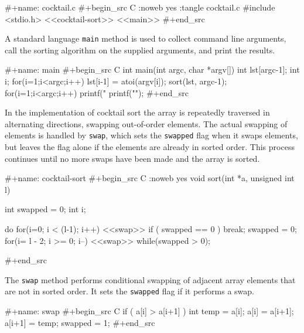 \documentclass[article,shortnames]{jss}
\begin{document}
\begin{Code}
#+name: cocktail.c
#+begin_src C :noweb yes :tangle cocktail.c
  #include <stdio.h>
  <<cocktail-sort>>
  <<main>>
#+end_src
\end{Code}






A standard  language \texttt{main} method is used to collect command line
arguments, call the sorting algorithm on the supplied arguments, and
print the results.


\begin{Code}
#+name: main
#+begin_src C
  int main(int argc, char *argv[]) {
    int lst[argc-1];
    int i;
    for(i=1;i<argc;i++)
      lst[i-1] = atoi(argv[i]);
    sort(lst, argc-1);
    for(i=1;i<argc;i++)
      printf("%
    printf("\n");
  }
#+end_src
\end{Code}






In the implementation of cocktail sort the array is repeatedly
traversed in alternating directions, swapping out-of-order elements.
The actual swapping of elements is handled by \texttt{swap}, which sets the
\texttt{swapped} flag when it swaps elements, but leaves the flag alone if
the elements are already in sorted order.  This process continues
until no more swaps have been made and the array is sorted.


\begin{Code}
#+name: cocktail-sort
#+begin_src C :noweb yes
  void sort(int *a, unsigned int l)
  {
    int swapped = 0;
    int i;

    do {
      for(i=0; i < (l-1); i++) {
        <<swap>>
      }
      if ( swapped == 0 ) break;
      swapped = 0;
      for(i= l - 2; i >= 0; i--) {
        <<swap>>
      }
    } while(swapped > 0);
  }
#+end_src
\end{Code}






The \texttt{swap} method performs conditional swapping of adjacent array
elements that are not in sorted order.  It sets the \texttt{swapped} flag if
it performs a swap.


\begin{Code}
#+name: swap
#+begin_src C
  if ( a[i] > a[i+1] ) {
    int temp = a[i];
    a[i] = a[i+1];
    a[i+1] = temp;
    swapped = 1;
  }
#+end_src
\end{Code}
\end{document}
